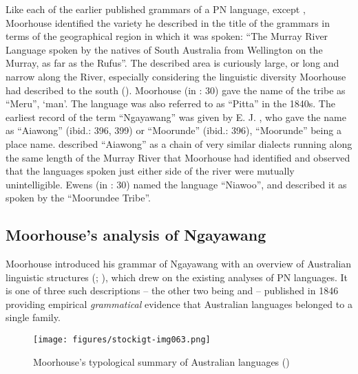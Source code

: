 Like each of the earlier published grammars of a PN language, except \citet{schurmann_letter_1844}, Moorhouse identified the variety he described in the title of the grammars in terms of the geographical region in which it was spoken: “The Murray River Language spoken by the natives of South Australia from Wellington on the Murray, as far as the Rufus”. The described area is curiously large, or long and narrow along the River, especially considering the linguistic diversity Moorhouse had described to the south (\citeyear{moorhouse_letter_1840}). Moorhouse (in \citealt{taplin_1879a_nodate}: 30) gave the name of the tribe as ``Meru'', `man'. The language was also referred to as “Pitta” in the 1840s. The earliest record of the term “Ngayawang” was given by E. J. \citet{Eyre1845}, who gave the name as “Aiawong” (ibid.: 396, 399) or “Moorunde” (ibid.: 396), ``Moorunde'' being a place name. \citet[396,399]{Eyre1845} described “Aiawong” as a chain of very similar dialects running along the same length of the Murray River that Moorhouse had identified and observed that the languages spoken just either side of the river were mutually unintelligible. Ewens (in \citealt{taplin_1879a_nodate}: 30) named the language ``Niawoo'', and described it as spoken by the ``Moorundee Tribe''.

\subsection{Moorhouse’s analysis of Ngayawang \citeyearpar{moorhouse_vocabulary_1846}}
\label{sec:key:6.4.1}\label{bkm:Ref340310942}\label{bkm:Ref466032933}

Moorhouse introduced his grammar of Ngayawang with an overview of Australian linguistic structures (\citeyear[v--vii]{moorhouse_vocabulary_1846}; ), which drew on the existing analyses of PN languages. It is one of three such descriptions -- the other two being \citet{Schürmann1846} and \citet{hale_languages_1846} -- published in 1846 providing empirical \textit{grammatical} evidence that Australian languages belonged to a single family.


\begin{figure}
\texttt{[image: figures/stockigt-img063.png]}
\caption{Moorhouse’s typological summary of Australian languages (\citeyear[vi]{moorhouse_vocabulary_1846})}
\label{fig:key:118}
\end{figure}

